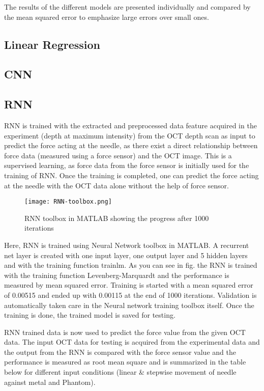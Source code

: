 
The results of the different models are presented individually and compared by the mean squared error to emphasize 
large errors over small ones.

\subsection{Linear Regression}
\subsection{CNN}
\subsection{RNN}
      RNN is trained with the extracted and preprocessed data feature acquired in the experiment (depth at maximum intensity) from the OCT depth scan as input to predict the force acting at the needle, as there exist a direct relationship between force data (measured using a force sensor) and the OCT image. This is a supervised learning, as force data from the force sensor is initially used for the training of RNN. Once the training is completed, one can predict the force acting at the needle with the OCT data alone without the help of force sensor.
      \begin{figure}
    \centering
    \texttt{[image: RNN-toolbox.png]}
    \caption{RNN toolbox in MATLAB showing the progress after 1000 iterations}
    \label{fig:RNN toolbox}
\end{figure}
      
      Here, RNN is trained using Neural Network toolbox in MATLAB. A recurrent net layer is created with one input layer, one output layer and 5 hidden layers and with the training function trainlm. As you can see in fig. the RNN is trained with the training function Levenberg-Marquardt and the performance is measured by mean squared error. Training is started with a mean squared error of 0.00515 and ended up with 0.00115 at the end of 1000 iterations. Validation is automatically taken care in the Neural network training toolbox itself. Once the training is done, the trained model is saved for testing. 
      
      RNN trained data is now used to predict the force value from the given OCT data. The input OCT data for testing is acquired from the experimental data and the output from the RNN is compared with the force sensor value and the performance is measured as root mean square and is summarized in the table below for different input conditions (linear & stepwise movement of needle against metal and Phantom). 
    
